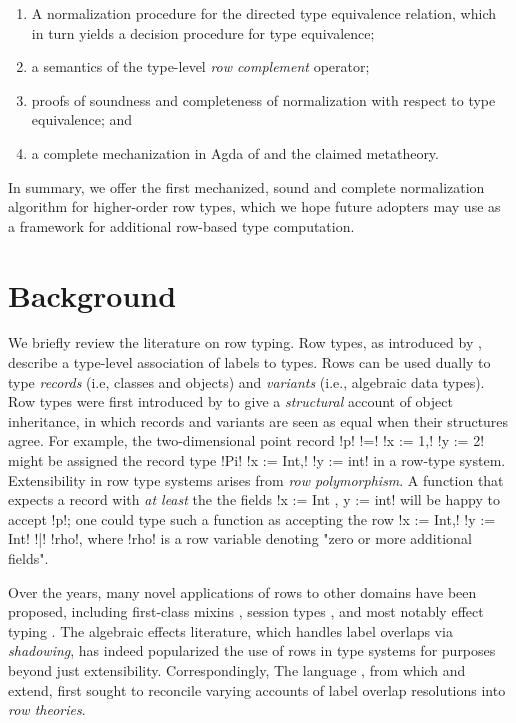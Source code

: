 \documentclass[sigplan,10pt,anonymous,review]{acmart}\settopmatter{printfolios=true,printccs=false,printacmref=false}
\begin{document}
\begin{enumerate}
  \item A normalization procedure for the directed \Rome type equivalence relation, which in turn yields a decision procedure for type equivalence;
  \item a semantics of the type-level \emph{row complement} operator;
  \item proofs of soundness and completeness of normalization with respect to type equivalence; and
  \item a complete mechanization in Agda of \Rome and the claimed metatheory.
\end{enumerate}

In summary, we offer the first mechanized, sound and complete normalization algorithm for higher-order row types, which we hope future adopters may use as a framework for additional row-based type  computation.

\section{Background}
We briefly review the literature on row typing. Row types, as introduced by \citet{wand87}, describe a type-level association of labels to types. Rows can be used dually to type \emph{records} (i.e, classes and objects) and \emph{variants} (i.e., algebraic data types). Row types were first introduced by \citet{wand87,Wand91,Remy89} to give a \emph{structural} account of object inheritance, in which records and variants are seen as equal when their structures agree. For example, the two-dimensional point record !p! !=! !{x := 1,! !y := 2}! might be assigned the record type !Pi! !{x := Int,! !y := int}! in a row-type system. Extensibility in row type systems arises from \emph{row polymorphism}. A function that expects a record with \emph{at least} the the fields !{x := Int , y := int}! will be happy to accept !p!; one could type such a function as accepting the row !{x := Int,! !y := Int! !|! !rho}!, where !rho! is a row variable denoting "zero or more additional fields".

Over the years, many novel applications of rows to other domains have been proposed, including first-class mixins \citep{MakholmW05}, session types \citep{LindleyM17}, and most notably effect typing \citep{Leijen05,Leijen14,LindleyC12,HillerstromL16}. The algebraic effects literature, which handles label overlaps via \emph{shadowing}, has indeed popularized the use of rows in type systems for purposes beyond just extensibility. Correspondingly, The \Rose language \citep{MorrisM19}, from which \RO and \Rome extend, first sought to reconcile varying accounts of label overlap resolutions into \emph{row theories}. 
\end{document}
